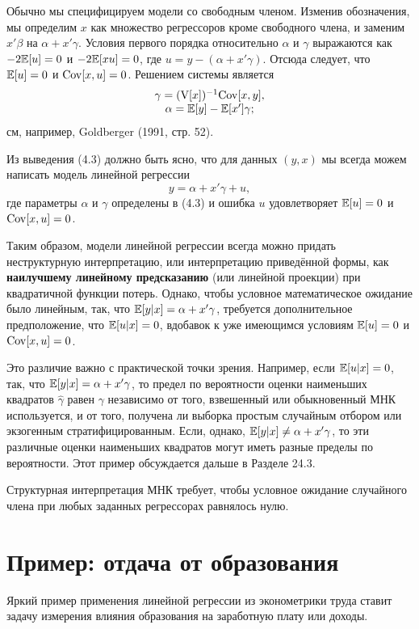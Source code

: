 Обычно мы специфицируем модели со свободным членом. Изменив обозначения, мы определим $x$ как  множество регрессоров кроме свободного члена, и заменим $x' \beta$ на $\alpha + x' \gamma$. Условия первого порядка относительно $\alpha$ и $\gamma$ выражаются как $-2\mathbb{E}{[u]}=0$ и $-2\mathbb{E}{[x u]}=0$, где $u = y - (\alpha + x' \gamma)$. Отсюда следует, что $\mathbb{E}{[u]}=0$ и $\mathrm{Cov}[x,u]=0$. Решением системы является
\begin{equation}
\begin{matrix}
\gamma = (\mathrm{V}[x])^{-1}\mathrm{Cov}[x,y], \\
\alpha = \mathbb{E}[y] - \mathbb{E}[x'] \gamma;
\end{matrix}
\end{equation} 
см, например, Goldberger (1991, стр. 52).

Из выведения (4.3) должно быть ясно, что для данных $(y, x)$ мы всегда можем написать модель линейной регрессии 
\begin{equation}
 y = \alpha + x' \gamma + u ,
\end{equation}
где параметры  $\alpha$ и $\gamma$ определены в (4.3) и ошибка $u$ удовлетворяет  $\mathbb{E}[u]=0$ и $\mathrm{Cov}[x,u]=0$.

Таким образом, модели линейной регрессии всегда можно придать неструктурную интерпретацию, или интерпретацию приведённой формы, как \textbf{наилучшему линейному предсказанию} (или линейной проекции) при квадратичной функции потерь. Однако, чтобы условное математическое ожидание было линейным, так, что $\mathbb{E}{[y|x]} = \alpha + x' \gamma$, требуется дополнительное предположение, что $\mathbb{E}{[u|x]} = 0$, вдобавок к уже имеющимся условиям $\mathbb{E}{[u]}=0$ и $\mathrm{Cov}[x,u]=0$. 

Это различие важно с практической точки зрения. Например, если $\mathbb{E}{[u|x]} = 0$, так, что  $\mathbb{E}{[y|x]} = \alpha + x' \gamma$, то предел по вероятности оценки наименьших квадратов $\hat{\gamma}$  равен $\gamma$ независимо от того, взвешенный или обыкновенный МНК используется, и от того, получена ли выборка простым случайным отбором или экзогенным стратифицированным. Если, однако, $\mathbb{E}{[y|x]} \neq \alpha + x' \gamma$, то эти различные оценки наименьших квадратов могут иметь разные пределы по вероятности. Этот пример обсуждается дальше в Разделе 24.3.

Структурная интерпретация МНК требует, чтобы условное ожидание случайного члена при любых заданных регрессорах равнялось нулю.


\section{Пример: отдача от образования}
Яркий пример применения линейной регрессии из эконометрики труда ставит задачу измерения влияния образования на заработную плату или доходы.

